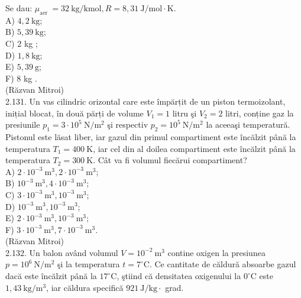 \documentclass[10pt]{article}
\begin{document}
Se dau: $\mu_{\text {aer }}=32 \mathrm{~kg} / \mathrm{kmol}, R=8,31 \mathrm{~J} / \mathrm{mol} \cdot \mathrm{K}$.\\
A) $4,2 \mathrm{~kg}$;\\
B) $5,39 \mathrm{~kg}$;\\
C) 2 kg ;\\
D) $1,8 \mathrm{~kg}$;\\
E) $5,39 \mathrm{~g}$;\\
F) 8 kg .\\
(Răzvan Mitroi)\\
2.131. Un vas cilindric orizontal care este împărțit de un piston termoizolant, inițial blocat, în două părți de volume $V_{1}=1$ litru şi $V_{2}=2$ litri, conține gaz la presiunile $p_{1}=3 \cdot 10^{5} \mathrm{~N} / \mathrm{m}^{2}$ şi respectiv $p_{2}=10^{5} \mathrm{~N} / \mathrm{m}^{2}$ la aceeaşi temperatură. Pistonul este lăsat liber, iar gazul din primul compartiment este încălzit până la temperatura $T_{1}=400 \mathrm{~K}$, iar cel din al doilea compartiment este încălzit până la temperatura $T_{2}=300 \mathrm{~K}$. Cât va fi volumul fiecărui compartiment?\\
A) $2 \cdot 10^{-3} \mathrm{~m}^{3}, 2 \cdot 10^{-3} \mathrm{~m}^{3}$;\\
B) $10^{-3} \mathrm{~m}^{3}, 4 \cdot 10^{-3} \mathrm{~m}^{3}$;\\
C) $3 \cdot 10^{-3} \mathrm{~m}^{3}, 10^{-3} \mathrm{~m}^{3}$;\\
D) $10^{-3} \mathrm{~m}^{3}, 10^{-3} \mathrm{~m}^{3}$;\\
E) $2 \cdot 10^{-3} \mathrm{~m}^{3}, 10^{-3} \mathrm{~m}^{3}$;\\
F) $3 \cdot 10^{-3} \mathrm{~m}^{3}, 7 \cdot 10^{-3} \mathrm{~m}^{3}$.\\
(Răzvan Mitroi)\\
2.132. Un balon având volumul $V=10^{-2} \mathrm{~m}^{3}$ contine oxigen la presiunea $p=10^{6} \mathrm{~N} / \mathrm{m}^{2}$ şi la temperatura $t=7^{\circ} \mathrm{C}$. Ce cantitate de căldură absoarbe gazul dacă este încălzit până la $17^{\circ} \mathrm{C}$, ştiind că densitatea oxigenului la $0^{\circ} \mathrm{C}$ este $1,43 \mathrm{~kg} / \mathrm{m}^{3}$, iar căldura specifică $921 \mathrm{~J} / \mathrm{kg} \cdot$ grad.
\end{document}
